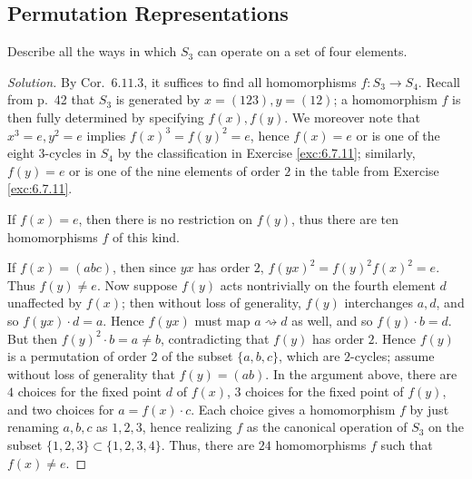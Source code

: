 \documentclass[12pt]{article}
\theoremstyle{remark}
\begin{document}
\subsection{Permutation Representations}
\begin{problem}
  Describe all the ways in which $S_3$ can operate on a set of four elements.
\end{problem}
\begin{proof}[Solution]
  By Cor.~$6.11.3$, it suffices to find all homomorphisms $f \colon S_3 \to S_4$. Recall from p.~42 that $S_3$ is generated by $x = (123),y = (12)$; a homomorphism $f$ is then fully determined by specifying $f(x),f(y)$. We moreover note that $x^3 = e,y^2=e$ implies $f(x)^3 = f(y)^2 = e$, hence $f(x) = e$ or is one of the eight $3$-cycles in $S_4$ by the classification in Exercise \ref{exc:6.7.11}; similarly, $f(y) = e$ or is one of the nine elements of order $2$ in the table from Exercise \ref{exc:6.7.11}.
  \par If $f(x) = e$, then there is no restriction on $f(y)$, thus there are ten homomorphisms $f$ of this kind.
  \par If $f(x) = (abc)$, then since $yx$ has order $2$, $f(yx)^2 = f(y)^2f(x)^2= e$. Thus $f(y) \ne e$. Now suppose $f(y)$ acts nontrivially on the fourth element $d$ unaffected by $f(x)$; then without loss of generality, $f(y)$ interchanges $a,d$, and so $f(yx)\cdot d = a$. Hence $f(yx)$ must map $a \rightsquigarrow d$ as well, and so $f(y) \cdot b = d$. But then $f(y)^2 \cdot b = a \ne b$, contradicting that $f(y)$ has order $2$. Hence $f(y)$ is a permutation of order $2$ of the subset $\{a,b,c\}$, which are $2$-cycles; assume without loss of generality that $f(y) = (ab)$. In the argument above, there are $4$ choices for the fixed point $d$ of $f(x)$, $3$ choices for the fixed point of $f(y)$, and two choices for $a = f(x) \cdot c$. Each choice gives a homomorphism $f$ by just renaming $a,b,c$ as $1,2,3$, hence realizing $f$ as the canonical operation of $S_3$ on the subset $\{1,2,3\} \subset \{1,2,3,4\}$. Thus, there are $24$ homomorphisms $f$ such that $f(x) \ne e$.
\end{proof}
\end{document}
